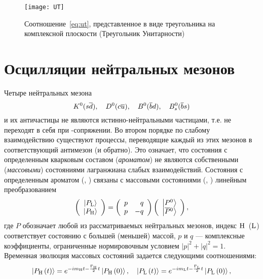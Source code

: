 \begin{figure}[H]
 \centering
  \texttt{[image: UT]}
   \caption{Соотношение~\eqref{eq:ut}, представленное в виде треугольника на комплексной плоскости (Треугольник Унитарности)}
  \label{fig:UT}
\end{figure}

\section{Осцилляции нейтральных мезонов} \label{sec:mixing}
Четыре нейтральных мезона
\begin{equation}
 K^0(s\overline{d}),\quad
 D^0(c\overline{u}),\quad
 B^0(\overline{b}d),\quad
 B_s^0(\overline{b}s)
\end{equation}
и их античастицы не являются истинно-нейтральными частицами, т.е. не переходят в себя при \cpconj-сопряжении.  Во втором порядке по слабому взаимодействию существуют процессы, переводящие каждый из этих мезонов в соответствующий антимезон (и обратно).  Это означает, что состояния с определенным кварковым составом (\emph{ароматом}) не являются собственными (\emph{массовыми}) состояниями лагранжиана слабых взаимодействий.  Состояния с определенным ароматом (\pz, \pzb) связаны с массовыми состояниями (\pa, \pb) линейным преобразованием
\begin{equation}\label{eq:basis_transformation}
 \left(\begin{array}{c}
 \left|P_{\mathrm{L}}\right> \\
 \left|P_{\mathrm{H}}\right>
 \end{array}\right) 
 =
 \left(\begin{array}{cc}
 p & \phantom{-}q \\
 p & -q
 \end{array}\right )
 \left(
 \begin{array}{c}
 \left|P^0\right> \\
 \left|\overline{P}{}^0\right>
 \end{array}\right ),
\end{equation}
где $P$ обозначает любой из рассматриваемых нейтральных мезонов, индекс $\mathrm{H}$~($\mathrm{L}$) соответствует состоянию с большей (меньшей) массой, $p$ и $q$ --- комплексные коэффициенты, ограниченные нормировочным условием $\left|p\right|^2 +\left|q\right|^2 = 1$.  Временная эволюция массовых состояний задается следующими соотношениями:
\begin{equation}\label{eq:mass_eig}
 \left|P_{\mathrm{H}}\left(t\right)\right> = e^{-im_{\mathrm{H}}t-\frac{\Gamma_{\mathrm{H}}}{2}t}\left|P_{\mathrm{H}}\left(0\right)\right>,\quad 
 \left|P_{\mathrm{L}}\left(t\right)\right> = e^{-im_{\mathrm{L}}t-\frac{\Gamma_{\mathrm{L}}}{2}t}\left|P_{\mathrm{L}}\left(0\right)\right>,
\end{equation}
